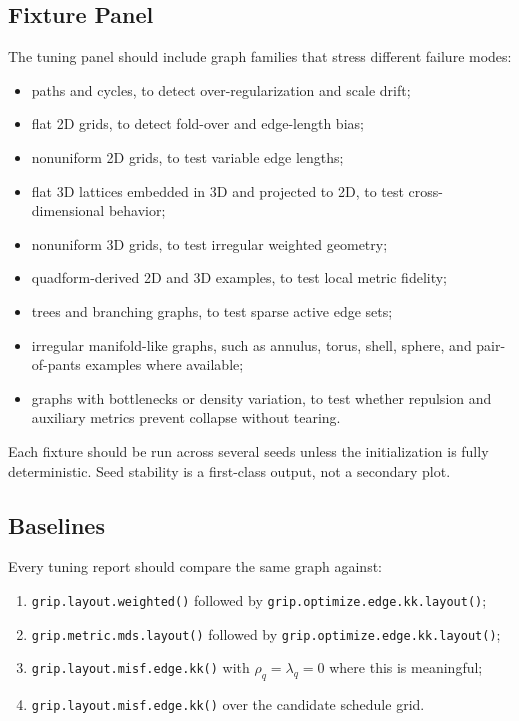 \documentclass[11pt]{article}
\newcommand{\Rfunc}[1]{\texttt{#1}}
\begin{document}
\subsection{Fixture Panel}

The tuning panel should include graph families that stress different failure
modes:
\begin{itemize}[leftmargin=2em]
  \item paths and cycles, to detect over-regularization and scale drift;
  \item flat 2D grids, to detect fold-over and edge-length bias;
  \item nonuniform 2D grids, to test variable edge lengths;
  \item flat 3D lattices embedded in 3D and projected to 2D, to test
  cross-dimensional behavior;
  \item nonuniform 3D grids, to test irregular weighted geometry;
  \item quadform-derived 2D and 3D examples, to test local metric fidelity;
  \item trees and branching graphs, to test sparse active edge sets;
  \item irregular manifold-like graphs, such as annulus, torus, shell, sphere,
  and pair-of-pants examples where available;
  \item graphs with bottlenecks or density variation, to test whether
  repulsion and auxiliary metrics prevent collapse without tearing.
\end{itemize}

Each fixture should be run across several seeds unless the initialization is
fully deterministic. Seed stability is a first-class output, not a secondary
plot.

\subsection{Baselines}

Every tuning report should compare the same graph against:
\begin{enumerate}[leftmargin=2em]
  \item \Rfunc{grip.layout.weighted()} followed by
  \Rfunc{grip.optimize.edge.kk.layout()};
  \item \Rfunc{grip.metric.mds.layout()} followed by
  \Rfunc{grip.optimize.edge.kk.layout()};
  \item \Rfunc{grip.layout.misf.edge.kk()} with \(\rho_q=\lambda_q=0\) where
  this is meaningful;
  \item \Rfunc{grip.layout.misf.edge.kk()} over the candidate schedule grid.
\end{enumerate}
\end{document}
